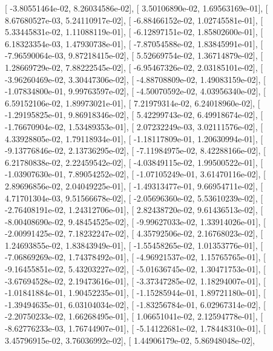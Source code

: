 \documentclass{article}
\begin{document}
       [ -3.80551464e-02,   8.26034586e-02],
       [  3.50106890e-02,   1.69563169e-01],
       [  8.67680527e-03,   5.24110917e-02],
       [ -6.88466152e-02,   1.02745581e-01],
       [  5.33445831e-02,   1.11088119e-01],
       [ -6.12897151e-02,   1.85802600e-01],
       [  6.18323354e-03,   1.47930738e-01],
       [ -7.87054588e-02,   1.83845991e-01],
       [ -7.96590064e-03,   9.87218415e-02],
       [  5.52669754e-02,   1.36714879e-02],
       [  1.28669729e-02,   7.88222545e-02],
       [ -6.95467326e-02,   2.03185101e-02],
       [ -3.96260469e-02,   3.30447306e-02],
       [ -4.88708809e-02,   1.49083159e-02],
       [ -1.07834800e-01,   9.99763597e-02],
       [ -4.50070592e-02,   4.03956340e-02],
       [  6.59152106e-02,   1.89973021e-01],
       [  7.21979314e-02,   6.24018960e-02],
       [ -1.29195825e-01,   9.86918346e-02],
       [  5.42299743e-02,   6.49918674e-02],
       [ -1.76670904e-02,   1.53489353e-01],
       [  2.07232249e-03,   3.02111576e-02],
       [  4.33928805e-02,   1.79118934e-01],
       [ -1.18117809e-01,   1.20630994e-01],
       [ -9.13776846e-02,   2.13736295e-02],
       [ -7.11984975e-02,   8.42288166e-02],
       [  6.21780838e-02,   2.22459542e-02],
       [ -4.03849115e-02,   1.99500522e-01],
       [ -1.03907630e-01,   7.89054252e-02],
       [ -1.07105249e-01,   3.61470116e-02],
       [  2.89696856e-02,   2.04049225e-01],
       [ -1.49313477e-01,   9.66954711e-02],
       [  4.71701304e-03,   9.51566678e-02],
       [ -2.05696360e-02,   5.53610239e-02],
       [ -2.76408191e-02,   1.24312706e-01],
       [  2.82438720e-02,   9.61436513e-02],
       [ -8.00408690e-02,   9.48454525e-02],
       [ -9.99627033e-02,   1.33914026e-01],
       [ -2.00991425e-02,   7.18232247e-02],
       [  4.35792506e-02,   2.16768023e-02],
       [  1.24693855e-02,   1.83843949e-01],
       [ -1.55458265e-02,   1.01353776e-01],
       [ -7.06869269e-02,   1.74378492e-01],
       [ -4.96921537e-02,   1.15765765e-01],
       [ -9.16455851e-02,   5.43203227e-02],
       [ -5.01636745e-02,   1.30471753e-01],
       [ -3.67694528e-02,   2.19473616e-01],
       [ -3.37347285e-02,   1.18294007e-01],
       [ -1.01841884e-01,   1.90452235e-01],
       [ -1.15285944e-01,   1.89721180e-01],
       [ -1.39494635e-01,   6.03104034e-02],
       [ -1.83256784e-01,   6.02967314e-02],
       [ -2.20750233e-02,   1.66268495e-01],
       [  1.06651041e-02,   2.12594778e-01],
       [ -8.62776233e-03,   1.76744907e-01],
       [ -5.14122681e-02,   1.78448310e-01],
       [  3.45796915e-02,   3.76036992e-02],
       [  1.44906179e-02,   5.86948048e-02],
\end{document}
